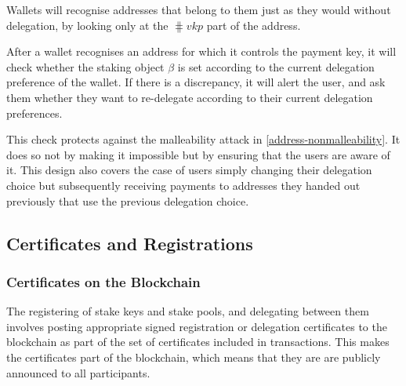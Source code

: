 \documentclass[11pt,a4paper]{article}
\begin{document}
Wallets will recognise addresses that belong to them just as they would
without delegation, by looking only at the \(\hash{vkp}\) part
of the address.

After a wallet recognises an address for which it controls the payment
key, it will check whether the staking object \(\beta\) is set according
to the current delegation preference of the wallet. If there is a
discrepancy, it will alert the user, and ask them whether they want to
re-delegate according to their current delegation preferences.

This check protects against the malleability attack in
\cref{address-nonmalleability}. It does so not by making it impossible but
by ensuring that the users are aware of it. This design also covers the case
of users simply changing their delegation choice but subsequently receiving
payments to addresses they handed out previously that use the previous
delegation choice.

\subsection{Certificates and Registrations}
\label{certificates-and-registrations}

\subsubsection{Certificates on the Blockchain}
\label{certificates-on-the-blockchain}

The registering of stake keys and stake pools, and delegating between them
involves posting appropriate signed registration or delegation certificates to
the blockchain as part of the set of certificates included in
transactions. This makes the certificates part of
the blockchain, which means that they are are publicly announced to all
participants.
\end{document}
